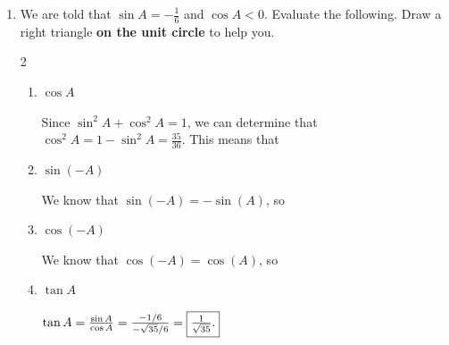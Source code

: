 \documentclass{article}
\begin{document}
\begin{enumerate}
\begin{multicols}{2}
\end{multicols}

\item
\begin{problem}
    We are told that $\sin A = -\frac{1}{6}$ and $\cos A<0$. Evaluate the following. Draw a right triangle \textbf{on the unit circle} to help you.
\end{problem}

\begin{multicols}{2}
\begin{enumerate}
    \item 
    \begin{problem}
        $\cos A$
    \end{problem}
    \pspace{1in}

    \begin{solution}
        Since $\sin^2 A + \cos^2 A = 1$, we can determine that $\cos^2 A = 1-\sin^2 A = \frac{35}{36}$. This means that 
    \end{solution}

    \item
    \begin{problem}
        $\sin(-A)$
    \end{problem}
    \pspace{1in}

    \begin{solution}
        We know that $\sin(-A)=-\sin(A)$, so 
    \end{solution}

    \item 
    \begin{problem}
        $\cos(-A)$
    \end{problem}
    
        \begin{solution}
        We know that $\cos(-A)=\cos(A)$, so 
    \end{solution}

    \columnbreak

    \item 
    \begin{problem}
        $\tan A$
    \end{problem}
        \pspace{1in}

    \begin{solution}
        $\tan A=\frac{\sin A}{\cos A} = \frac{-1/6}{-\sqrt{35}/6}=\fbox{$\frac{1}{\sqrt{35}}$.}$
    \end{solution}


\end{enumerate}
\end{multicols}
\end{enumerate}
\end{document}
